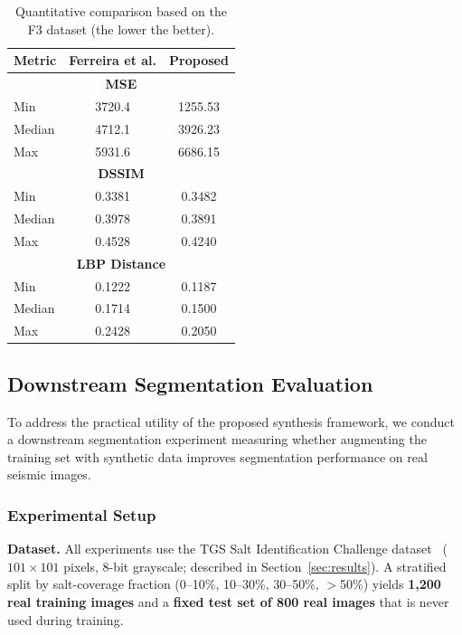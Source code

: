 \documentclass{ieeeaccess}
\begin{document}
\begin{table}[htbp]
    \centering
    \caption{Quantitative comparison based on the F3 dataset (the lower the better).}
    \label{tab:metricsSummary}
    \begin{tabular}{lcc}
        \toprule
        \textbf{Metric} & \textbf{Ferreira et al.} & \textbf{Proposed} \\
        \midrule
        \multicolumn{3}{c}{\textbf{MSE}} \\
        Min & 3720.4 & 1255.53 \\
        Median & 4712.1 & 3926.23 \\
        Max & 5931.6 & 6686.15 \\
        \midrule
        \multicolumn{3}{c}{\textbf{DSSIM}} \\
        Min & 0.3381 & 0.3482 \\
        Median & 0.3978 & 0.3891 \\
        Max & 0.4528 & 0.4240 \\
        \midrule
        \multicolumn{3}{c}{\textbf{LBP Distance}} \\
        Min & 0.1222 & 0.1187 \\
        Median & 0.1714 & 0.1500 \\
        Max & 0.2428 & 0.2050 \\
        \bottomrule
    \end{tabular}
\end{table}

\subsection{Downstream Segmentation Evaluation}
\label{sec:downstream}

To address the practical utility of the proposed synthesis framework, we conduct a downstream segmentation experiment measuring whether augmenting the training set with synthetic data improves segmentation performance on real seismic images.

\subsubsection{Experimental Setup}

\noindent\textbf{Dataset.} All experiments use the TGS Salt Identification Challenge dataset~\cite{TGS2023} ($101 \times 101$ pixels, 8-bit grayscale; described in Section~\ref{sec:results}). A stratified split by salt-coverage fraction (0--10\%, 10--30\%, 30--50\%, $>$50\%) yields \textbf{1{,}200 real training images} and a \textbf{fixed test set of 800 real images} that is never used during training.
\end{document}
